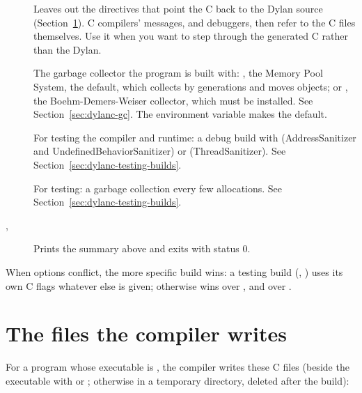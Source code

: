 \begin{description}
\item[]
  Leaves out the  directives that point the C back to the
  Dylan source (Section~\ref{sec:dylanc-files}). C compilers' messages,
  and debuggers, then refer to the C files themselves. Use it when you
  want to step through the generated C rather than the Dylan.

\item[ ] 
  The garbage collector the program is built with: , the Memory
  Pool System, the default, which collects by generations and moves
  objects; or , the Boehm-Demers-Weiser collector, which must
  be installed. See Section~\ref{sec:dylanc-gc}. The environment variable
   makes  the default.

\item[ ]
  For testing the compiler and runtime: a debug build with
    (AddressSanitizer and
  UndefinedBehaviorSanitizer) or  (ThreadSanitizer). See
  Section~\ref{sec:dylanc-testing-builds}.

\item[]
  For testing: a garbage collection every few allocations. See
  Section~\ref{sec:dylanc-testing-builds}.

\item[, ]
  Prints the summary above and exits with status 0.
\end{description}

When options conflict, the more specific build wins: a testing build
(, ) uses its own C flags whatever
else is given; otherwise  wins over , and  over
.

\section{The files the compiler writes}\label{sec:dylanc-files}

For a program whose executable is , the compiler writes these
C files (beside the executable with  or ; otherwise in a
temporary directory, deleted after the build):

